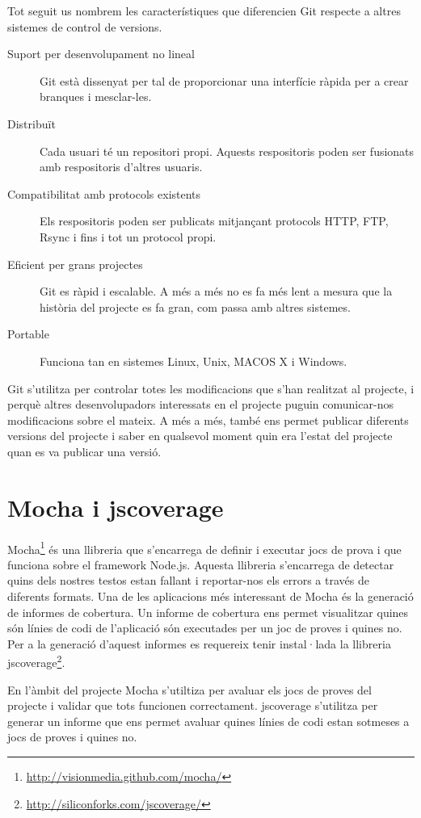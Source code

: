 Tot seguit us nombrem les característiques que diferencien Git respecte a altres sistemes de control de versions.

\begin{description}
    \item[Suport per desenvolupament no lineal] Git està dissenyat per tal de proporcionar una interfície ràpida per a crear branques i mesclar-les.
    \item[Distribuït] Cada usuari té un repositori propi. Aquests respositoris poden ser fusionats amb respositoris d'altres usuaris.
    \item[Compatibilitat amb protocols existents] Els respositoris poden ser publicats mitjançant protocols HTTP, FTP, Rsync i fins i tot un protocol propi.
    \item[Eficient per grans projectes] Git es ràpid i escalable. A més a més no es fa més lent a mesura que la història del projecte es fa gran, com passa amb altres sistemes.
    \item[Portable] Funciona tan en sistemes Linux, Unix, MACOS X i Windows.
\end{description}

Git s'utilitza per controlar totes les modificacions que s'han realitzat al projecte, i perquè altres desenvolupadors interessats en el projecte puguin comunicar-nos modificacions sobre el mateix. A més a més, també ens permet publicar diferents versions del projecte i saber en qualsevol moment quin era l'estat del projecte quan es va publicar una versió. 


\section{Mocha i jscoverage}
\label{sec:mocha-jscoverage}

Mocha\footnote{\url{http://visionmedia.github.com/mocha/}} és una llibreria que s'encarrega de definir i executar jocs de prova i que funciona sobre el framework Node.js. Aquesta llibreria s'encarrega de detectar quins dels nostres testos estan fallant i reportar-nos els errors a través de diferents formats. Una de les aplicacions més interessant de Mocha és la generació de informes de cobertura. Un informe de cobertura ens permet visualitzar quines són línies de codi de l'aplicació són executades per un joc de proves i quines no. Per a la generació d'aquest informes es requereix tenir instal·lada la llibreria jscoverage\footnote{\url{http://siliconforks.com/jscoverage/}}. 

En l'àmbit del projecte Mocha s'utiltiza per avaluar els jocs de proves del projecte i validar que tots funcionen correctament. jscoverage s'utilitza per generar un informe que ens permet avaluar quines línies de codi estan sotmeses a jocs de proves i quines no.

